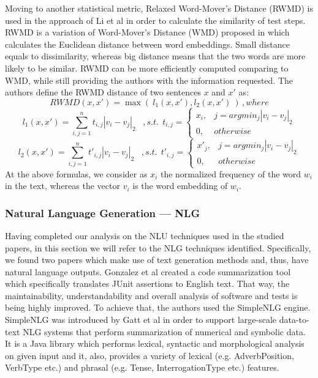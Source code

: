 Moving to another statistical metric, Relaxed Word-Mover's Distance (RWMD) is used in the approach of Li et al \cite{10.1145/3368089.3417067} in order to calculate the similarity of test steps. RWMD is 
a variation of Word-Mover's Distance (WMD) proposed in \cite{pmlr-v37-kusnerb15} which calculates the Euclidean distance between word embeddings. Small distance equals to dissimilarity, whereas big distance means 
that the two words are more likely to be similar. RWMD can be more efficiently computed comparing to WMD, while still providing the authors with the information requested. The authors define the RWMD distance of 
two sentences \(x\) and \(x'\) as:
\[ RWMD(x, x')=\max(\:l_1(x,x'), l_2(x,x')\:)\,   ,  where\]
\[ l_1(x, x')=\sum_{i,j=1}^{n}t_{i,j}|v_i-v_j|_2\, \:\:\:  ,    s.t.\:\:t_{i,j}=\begin{cases}
                                                                x_i, & j = argmin_j|v_i-v_j|_2\\
                                                                0,    &   otherwise \end{cases} \]
\[ l_2(x, x')=\sum_{i,j=1}^{n}t'_{i,j}|v_i-v_j|_2\, \:\:\:  ,    s.t.\:\:t'_{i,j}=\begin{cases}
                                                                x'_j, & j = argmin_j|v_i-v_j|_2\\
                                                                0,    &   otherwise \end{cases} \]
At the above formulas, we consider as \(x_i\) the normalized frequency of the word \(w_i\) in the text, whereas the vector \(v_i\) is the word embedding of \(w_i\).\\

\subsubsection* {Natural Language Generation --- NLG}
Having completed our analysis on the NLU techniques used in the studied papers, in this section we will refer to the NLG techniques identified. Specifically, we found two papers which make use of 
text generation methods and, thus, have natural language outputs. Gonzalez et al \cite{10.1145/3283812.3283819} created a code summarization tool which specifically translates JUnit assertions to English text. 
That way, the maintainability, understandability and overall analysis of software and tests is being highly improved. To achieve that, the authors used the SimpleNLG engine. SimpleNLG was introduced by Gatt et al 
\cite{gatt2009simplenlg} in order to support large-scale data-to-text NLG systems that perform summarization of numerical and symbolic data. It is a Java library which performs lexical, syntactic and 
morphological analysis on given input and it, also, provides a variety of lexical (e.g. AdverbPosition, VerbType etc.) and phrasal (e.g. Tense, InterrogationType etc.) features.\\

